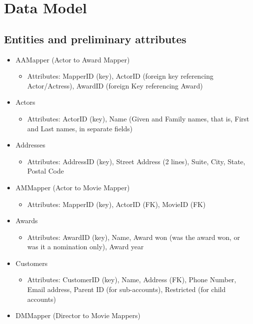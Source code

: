 \documentclass[letterpaper,12pt]{article}
\begin{document}
\section{Data Model}
\subsection{Entities and preliminary attributes}
\begin{itemize}
	\item AAMapper (Actor to Award Mapper)
	      \begin{itemize}
		      \item Attributes: MapperID (key), ActorID (foreign key referencing Actor/Actress), AwardID (foreign Key referencing Award)
	      \end{itemize}
	\item Actors
	      \begin{itemize}
		      \item Attributes: ActorID (key), Name (Given and Family names, that is, First and Last names, in separate fields)
	      \end{itemize}
	\item Addresses
	      \begin{itemize}
		      \item Attributes: AddressID (key), Street Address (2 lines), Suite, City, State, Postal Code
	      \end{itemize}
	\item AMMapper (Actor to Movie Mapper)
	      \begin{itemize}
		      \item Attributes: MapperID (key), ActorID (FK), MovieID (FK)
	      \end{itemize}
	\item Awards
	      \begin{itemize}
		      \item Attributes: AwardID (key), Name, Award won (was the award won, or was it a nomination only), Award year
	      \end{itemize}
	\item Customers
	      \begin{itemize}
		      \item Attributes: CustomerID (key), Name, Address (FK), Phone Number, Email address, Parent ID (for sub-accounts), Restricted (for child accounts)
	      \end{itemize}
	\item DMMapper (Director to Movie Mappers)
	      \begin{itemize}

\end{itemize}
\end{itemize}
\end{document}
